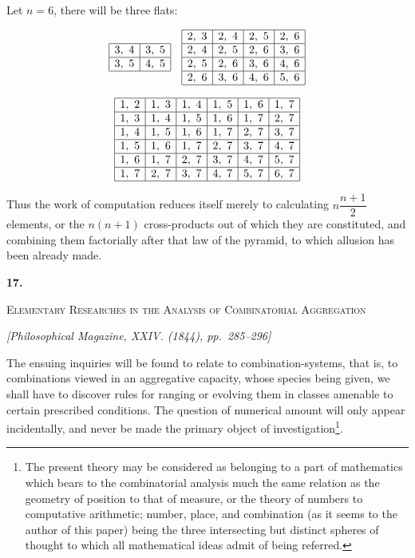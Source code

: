 \documentclass[11pt]{article}
\newcommand{\paperhead}[3]{%
  \clearpage
  \begin{center}
  {\Large\bfseries #1.}\par\vspace{0.85em}
  {\large\scshape #2}\par\vspace{0.6em}
  {\itshape [#3]}\par
  \end{center}\vspace{0.4em}}
\newcommand{\sourcepage}[1]{\marginpar{\scriptsize p.~#1}}
\begin{document}
Let $n=6$, there will be three flats:
{\scriptsize
\[
\begin{array}{cc}
\begin{array}{|c|c|}\hline
3,\ 4&3,\ 5\\ \hline
3,\ 5&4,\ 5\\ \hline
\end{array}
&
\begin{array}{|c|c|c|c|}\hline
2,\ 3&2,\ 4&2,\ 5&2,\ 6\\ \hline
2,\ 4&2,\ 5&2,\ 6&3,\ 6\\ \hline
2,\ 5&2,\ 6&3,\ 6&4,\ 6\\ \hline
2,\ 6&3,\ 6&4,\ 6&5,\ 6\\ \hline
\end{array}
\end{array}
\]
{\scriptsize
\[
\begin{array}{|c|c|c|c|c|c|}\hline
1,\ 2&1,\ 3&1,\ 4&1,\ 5&1,\ 6&1,\ 7\\ \hline
1,\ 3&1,\ 4&1,\ 5&1,\ 6&1,\ 7&2,\ 7\\ \hline
1,\ 4&1,\ 5&1,\ 6&1,\ 7&2,\ 7&3,\ 7\\ \hline
1,\ 5&1,\ 6&1,\ 7&2,\ 7&3,\ 7&4,\ 7\\ \hline
1,\ 6&1,\ 7&2,\ 7&3,\ 7&4,\ 7&5,\ 7\\ \hline
1,\ 7&2,\ 7&3,\ 7&4,\ 7&5,\ 7&6,\ 7\\ \hline
\end{array}
\]

Thus the work of computation reduces itself merely to calculating $n\dfrac{n+1}{2}$ elements, or the $n(n+1)$ cross-products out of which they are constituted, and combining them factorially after that law of the pyramid, to which allusion has been already made.

\paperhead{17}{Elementary Researches in the Analysis of Combinatorial Aggregation}{Philosophical Magazine, XXIV. (1844), pp.~285--296}

\sourcepage{91}
The ensuing inquiries will be found to relate to combination-systems, that is, to combinations viewed in an aggregative capacity, whose species being given, we shall have to discover rules for ranging or evolving them in classes amenable to certain prescribed conditions. The question of numerical amount will only appear incidentally, and never be made the primary object of investigation\footnote{The present theory may be considered as belonging to a part of mathematics which bears to the combinatorial analysis much the same relation as the geometry of position to that of measure, or the theory of numbers to computative arithmetic; number, place, and combination (as it seems to the author of this paper) being the three intersecting but distinct spheres of thought to which all mathematical ideas admit of being referred.}.

}}
\end{document}
